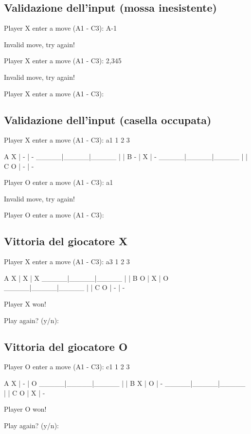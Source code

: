 \documentclass{article}
\begin{document}
\subsection{Validazione dell'input (mossa inesistente)}
    \begin{spverbatim}
    Player X enter a move (A1 - C3): 
    A-1

    Invalid move, try again!

    Player X enter a move (A1 - C3): 
    2,345

    Invalid move, try again!

    Player X enter a move (A1 - C3): 
    \end{spverbatim}

\subsection{Validazione dell'input (casella occupata)}
    \begin{spverbatim}
    Player X enter a move (A1 - C3): 
    a1
         1     2     3

    A    X  |  -  |  -  
       _____|_____|_____
            |     |     
    B    -  |  X  |  -  
       _____|_____|_____
            |     |     
    C    O  |  -  |  -  

    Player O enter a move (A1 - C3): 
    a1

    Invalid move, try again!

    Player O enter a move (A1 - C3): 
    \end{spverbatim}

\subsection{Vittoria del giocatore X}
    \begin{spverbatim}
    Player X enter a move (A1 - C3): 
    a3
         1     2     3

    A    X  |  X  |  X  
       _____|_____|_____
            |     |     
    B    O  |  X  |  O  
       _____|_____|_____
            |     |     
    C    O  |  -  |  -  

    Player X won!

    Play again? (y/n):
    \end{spverbatim}

\subsection{Vittoria del giocatore O}
    \begin{spverbatim}
    Player O enter a move (A1 - C3): 
    c1
         1     2     3

    A    X  |  -  |  O  
       _____|_____|_____
            |     |     
    B    X  |  O  |  -  
       _____|_____|_____
            |     |     
    C    O  |  X  |  -  

    Player O won!

    Play again? (y/n):
    \end{spverbatim}
\end{document}
